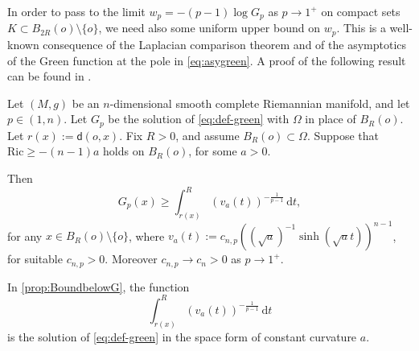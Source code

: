 \documentclass[a4paper,12pt,reqno]{amsart}
\numberwithin{equation}{section}
\theoremstyle{plain}
\theoremstyle{definition}
\theoremstyle{remark}
\newcommand{\dist}{\mathsf{d}}
\newcommand{\de}{\ensuremath{\,\mathrm d}} %
\begin{document}
{In order to pass to the limit $w_p = -(p-1) \log G_p$ as $p \to 1^+$ on compact sets $K \subset B_{2R}(o)\setminus\{o\}$, we need also some uniform upper bound on $w_p$. This is a well-known consequence of the Laplacian comparison theorem {and of the asymptotics of the Green function at the pole in \eqref{eq:asygreen}}. A proof of the following result can be found in \cite[Theorem 2]{Kura}.
\begin{proposition}\label{prop:BoundbelowG}
    Let $(M, g)$ be an $n$-dimensional smooth complete Riemannian manifold, and let $p\in (1,n)$. Let $G_p$ be the solution of \eqref{eq:def-green} with $\Omega$ in place of $B_R(o)$. Let $r(x):=\dist(o,x)$. Fix $R>0$, and assume $B_R(o)\subset\Omega$. Suppose that $\mathrm{Ric} \geq - (n-1)a$ holds on $B_R(o)$, for some $a > 0$. 
    
    Then
    \begin{equation}
\label{eq:altrocontrollo}
        G_p(x) \geq \int_{r(x)}^R (v_a(t))^{-\frac{1}{p-1}} \de t, 
    \end{equation}
    for any $x \in B_R(o)\setminus\{o\}$, where $v_a(t):= c_{n,p}\left(\left(\sqrt{a}\right)^{-1}\sinh(\sqrt{a}t)\right)^{n-1}$, for suitable $c_{n,p}>0$.   
    Moreover $c_{n,p} \to c_n>0$ as $p\to1^+$.
\end{proposition}
\begin{remark}
    In \cref{prop:BoundbelowG}, the function 
    \[
    \int_{r(x)}^R (v_a(t))^{-\frac{1}{p-1}} \de t
\]
is the solution of \eqref{eq:def-green} in the space form of constant curvature $a$.
\end{remark}

}
\end{document}
